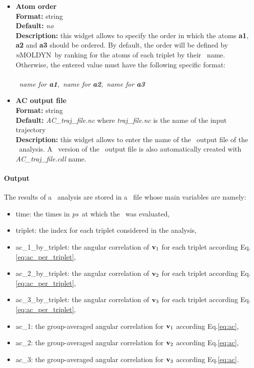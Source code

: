 \documentclass[a4paper,11pt]{report}
\newcommand{\ps}{\textit{ps}}
\newcommand{\NMOLDYN}{\textit{n}MOLDYN}
\begin{document}
\begin{itemize}
\hypertarget{ac_atom_order}{}
\item \textbf{Atom order}\\
\textbf{Format:} string\\
\textbf{Default:} \textit{no}\\
\textbf{Description:} this widget allows to specify the order in which the atoms \textbf{a1}, \textbf{a2} and \textbf{a3} should be 
ordered. By default, the order will be defined by \NMOLDYN\ by ranking for the atoms of each triplet by their
\MMTK\ name. Otherwise, the entered value must have the following specific format:
\\\\
\textit{\MMTK\ name for \textbf{a1},\MMTK\ name for \textbf{a2},\MMTK\ name for \textbf{a3}}

\hypertarget{ac_ac_output_file}{}
\item \textbf{AC output file}\\
\textbf{Format:} string\\
\textbf{Default:} \textit{AC\_traj\_file.nc} where \textit{traj\_file.nc} is the name of the input trajectory\\
\textbf{Description:} this widget allows to enter the name of the \NetCDF\ output file of the \AC\ analysis. A \CDL\ 
version of the \NetCDF\ output file is also automatically created with \textit{AC\_traj\_file.cdl} name.
\end{itemize}
\newpage
\paragraph{Output\\}
The results of a \AC\ analysis are stored in a \NetCDF\ file whose main variables are namely:
\begin{itemize}
\item time: the times in \ps\ at which the \AC\ was evaluated,
\item triplet: the index for each triplet considered in the analysis,
\item ac\_1\_by\_triplet: the angular correlation of ${\bf v}_1$ for each triplet according Eq.\ref{eq:ac_per_triplet},
\item ac\_2\_by\_triplet: the angular correlation of ${\bf v}_2$ for each triplet according Eq.\ref{eq:ac_per_triplet},
\item ac\_3\_by\_triplet: the angular correlation of ${\bf v}_3$ for each triplet according Eq.\ref{eq:ac_per_triplet},
\item ac\_1: the group-averaged angular correlation for ${\bf v}_1$ according Eq.\ref{eq:ac},
\item ac\_2: the group-averaged angular correlation for ${\bf v}_2$ according Eq.\ref{eq:ac},
\item ac\_3: the group-averaged angular correlation for ${\bf v}_3$ according Eq.\ref{eq:ac}.
\end{itemize}
\end{document}
